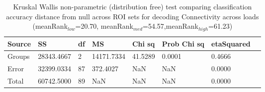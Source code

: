 \begin{table}
\centering
\begin{tabular}[0.2em]{@{}llllllll@{}}\toprule
Source & SS & df & MS & Chi sq & Prob Chi sq & etaSquared\\\toprule[0.2em]
Groups & 28343.4667 & 2 & 14171.7334 & 41.5289 & 0.0001 & 0.4666 \\\midrule
Error & 32399.0334 & 87 & 372.4027 & NaN & NaN & 0.0000 \\\midrule
Total & 60742.5000 & 89 & NaN & NaN & NaN & 0.0000 \\\bottomrule[0.2em]
\end{tabular}
\caption{Kruskal Wallis non-parametric (distribution free) test comparing classification accuracy distance from null across ROI sets for decoding Connectivity across loads (meanRank$_{low}$=20.70, meanRank$_{med}$=54.57,meanRank$_{high}$=61.23)\label{tabel:null}}
\end{table}
